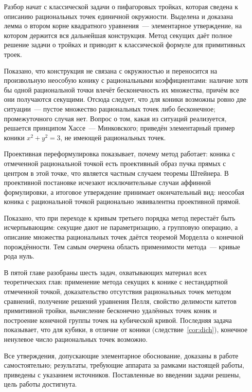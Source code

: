 \documentclass[a4paper,14pt]{extreport}
\theoremstyle{definition}
\begin{document}
Разбор начат с классической задачи о пифагоровых тройках, которая сведена к
описанию рациональных точек единичной окружности. Выделена и доказана лемма о
втором корне квадратного уравнения~--- элементарное утверждение, на котором
держится вся дальнейшая конструкция. Метод секущих даёт полное решение задачи о
тройках и приводит к классической формуле для примитивных троек.

Показано, что конструкция не связана с окружностью и переносится на произвольную
неособую конику с рациональными коэффициентами: наличие хотя бы одной
рациональной точки влечёт бесконечность их множества, причём все они получаются
секущими. Отсюда следует, что для коники возможны ровно две ситуации~--- пустое
множество рациональных точек либо бесконечное; промежуточного случая нет. Вопрос
о том, какая из ситуаций реализуется, решается принципом Хассе~--- Минковского;
приведён элементарный пример коники $x^2+y^2=3$, не имеющей рациональных точек.

Проективная переформулировка показывает, почему метод работает: коника с
отмеченной рациональной точкой есть проективный образ пучка прямых с центром в
этой точке, что является частным случаем теоремы Штейнера. В проективной
постановке исчезают исключительные случаи аффинной формулировки, а итоговое
утверждение принимает окончательный вид: неособая коника с рациональной точкой
рационально эквивалентна проективной прямой.

Показано, что при переходе к кривым третьего порядка метод перестаёт быть
исчерпывающим: секущие дают не параметризацию, а групповую операцию, а описание
множества рациональных точек даётся теоремой Морделла о конечной порождённости.
Тем самым очерчена область применимости метода~--- кривые рода нуль.

В пятой главе разобраны шесть задач, охватывающих материал всех теоретических
глав: применение метода секущих к конике с нестандартной отмеченной точкой,
доказательство отсутствия рациональных точек методом сравнений, получение
решений уравнения Пелля, свойство делимости катетов примитивной тройки,
вычисление бесконечно удалённых точек коник и построение конечной группы точек
на кубической кривой. Последняя задача показывает, что для
кубики, в отличие от коники (следствие~\ref{cor:dich}), конечное ненулевое
число рациональных точек возможно.

Все утверждения, допускающие элементарное обоснование, доказаны в работе
самостоятельно; результаты, требующие аппарата за рамками настоящей работы,
приведены с указанием источников. Поставленные во введении задачи решены, цель
работы достигнута.
\end{document}
